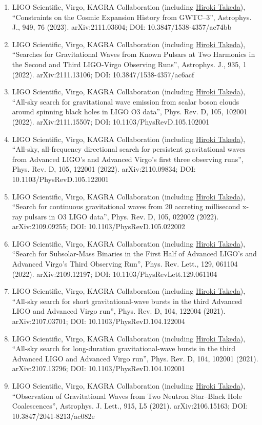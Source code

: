 \documentclass[uplatex, 11pt]{jsarticle}
\begin{document}
\begin{enumerate}
\item LIGO Scientific, Virgo, KAGRA Collaboration (including \uline{Hiroki Takeda}), “Constraints on the Cosmic Expansion History from GWTC–3”, Astrophys. J., 949, 76 (2023). arXiv:2111.03604; DOI: 10.3847/1538-4357/ac74bb
\item LIGO Scientific, Virgo, KAGRA Collaboration (including \uline{Hiroki Takeda}), “Searches for Gravitational Waves from Known Pulsars at Two Harmonics in the Second and Third LIGO-Virgo Observing Runs”, Astrophys. J., 935, 1 (2022). arXiv:2111.13106; DOI: 10.3847/1538-4357/ac6acf
\item LIGO Scientific, Virgo, KAGRA Collaboration (including \uline{Hiroki Takeda}), “All-sky search for gravitational wave emission from scalar boson clouds around spinning black holes in LIGO O3 data”, Phys. Rev. D, 105, 102001 (2022). arXiv:2111.15507; DOI: 10.1103/PhysRevD.105.102001
\item LIGO Scientific, Virgo, KAGRA Collaboration (including \uline{Hiroki Takeda}), “All-sky, all-frequency directional search for persistent gravitational waves from Advanced LIGO's and Advanced Virgo's first three observing runs”, Phys. Rev. D, 105, 122001 (2022). arXiv:2110.09834; DOI: 10.1103/PhysRevD.105.122001
\item LIGO Scientific, Virgo, KAGRA Collaboration (including \uline{Hiroki Takeda}), “Search for continuous gravitational waves from 20 accreting millisecond
x-ray pulsars in O3 LIGO data”, Phys. Rev. D, 105, 022002 (2022). arXiv:2109.09255; DOI: 10.1103/PhysRevD.105.022002
\item LIGO Scientific, Virgo, KAGRA Collaboration (including \uline{Hiroki Takeda}), “Search for Subsolar-Mass Binaries in the First Half of Advanced LIGO's and Advanced Virgo's Third Observing Run”, Phys. Rev. Lett., 129, 061104 (2022). arXiv:2109.12197; DOI: 10.1103/PhysRevLett.129.061104
\item LIGO Scientific, Virgo, KAGRA Collaboration (including \uline{Hiroki Takeda}), “All-sky search for short gravitational-wave bursts in the third Advanced LIGO and Advanced Virgo run”, Phys. Rev. D, 104, 122004 (2021). arXiv:2107.03701; DOI: 10.1103/PhysRevD.104.122004
\item LIGO Scientific, Virgo, KAGRA Collaboration (including \uline{Hiroki Takeda}), “All-sky search for long-duration gravitational-wave bursts in the third Advanced LIGO and Advanced Virgo run”, Phys. Rev. D, 104, 102001 (2021). arXiv:2107.13796; DOI: 10.1103/PhysRevD.104.102001
\item LIGO Scientific, Virgo, KAGRA Collaboration (including \uline{Hiroki Takeda}), “Observation of Gravitational Waves from Two Neutron Star–Black Hole Coalescences”, Astrophys. J. Lett., 915, L5 (2021). arXiv:2106.15163; DOI: 10.3847/2041-8213/ac082e

\end{enumerate}
\end{document}
